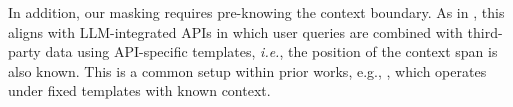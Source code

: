 In addition, our masking requires pre-knowing the context boundary.  As in \cite{piet2024jatmo}, this aligns with LLM-integrated APIs in which user queries are combined with third-party data using API-specific templates, \emph{i.e.}, the position of the context span is also known.
This is a common setup within prior works, e.g., \citet{chen2024struq, chen2024aligning, piet2024jatmo, abdelnabi2024you}, which operates under fixed templates with known context.

